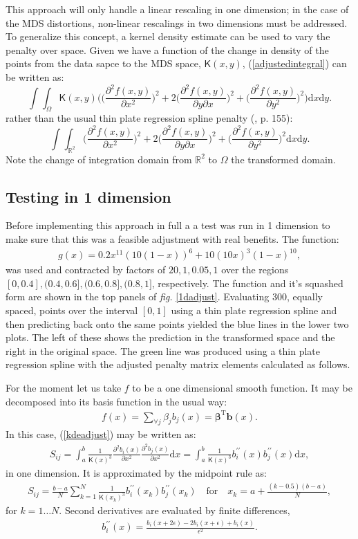 \documentclass[a4paper,10pt]{article}
\newcommand{\fig}[1]{\emph{fig.} \ref{#1}}
\newcommand{\eqn}[1]{(\ref{#1})}
\newcommand{\tr}[1]{#1^{\text{T}}}
\newcommand{\be}{\begin{eqnarray}}
\newcommand{\ee}{\end{eqnarray}}
\newcommand{\tprs}{thin plate regression spline }
\begin{document}
This approach will only handle a linear rescaling in one dimension; in the case of the MDS distortions, non-linear rescalings in two dimensions must be addressed. To generalize this concept, a kernel density estimate can be used to vary the penalty over space. Given we have a function of the change in density of the points from the data sapce to the MDS space, $\mathsf{K}(x,y)$, \eqn{adjustedintegral} can be written as:
\begin{equation}
\int\int_\Omega \mathsf{K}(x,y) \Big( \Big(\frac{\partial^2 f(x,y)}{\partial x^2}\Big)^2 + 2\Big(\frac{\partial^2 f(x,y)}{\partial y \partial x}\Big)^2 + \Big(\frac{\partial^2 f(x,y)}{\partial y^2}\Big)^2\Big) \text{d}x\text{d}y.
\label{kdeadjust}
\end{equation}
rather than the usual thin plate regression spline penalty (\cite{simonbook}, p. 155):
\begin{equation}
\int\int_{\mathbb{R}^2} \Big(\frac{\partial^2 f(x,y)}{\partial x^2}\Big)^2 + 2\Big(\frac{\partial^2 f(x,y)}{\partial y \partial x}\Big)^2 + \Big(\frac{\partial^2 f(x,y)}{\partial y^2}\Big)^2 \text{d}x\text{d}y.
\end{equation}
Note the change of integration domain from $\mathbb{R}^2$ to $\Omega$ the transformed domain.

\subsection{Testing in 1 dimension}

Before implementing this approach in full a a test was run in 1 dimension to make sure that this was a feasible adjustment with real benefits. The function:
\be
g(x)=0.2x^{11}(10(1-x))^6+10(10x)^3(1-x)^{10},
\ee
was used and contracted by factors of $20,1,0.05,1$ over the regions $[0,0.4], (0.4,0.6],(0.6,0.8],(0.8,1]$, respectively. The function and it's squashed form are shown in the top panels of \fig{1dadjust}. Evaluating 300, equally spaced, points over the interval $[0,1]$ using a thin plate regression spline and then predicting back onto the same points yielded the blue lines in the lower two plots. The left of these shows the prediction in the transformed space and the right in the original space. The green line was produced using a \tprs with the adjusted penalty matrix elements calculated as follows.

For the moment let us take $f$ to be a one dimensional smooth function. It may be decomposed into its basis function in the usual way:
\be
f(x)=\sum_{\forall j} \beta_j b_j(x) = \tr{\mathbf{\beta}}\mathbf{b}(x).
\ee
In this case, \eqn{kdeadjust} may be written as:
\be
S_{ij}= \int_a^b \frac{1}{\mathsf{K}(x)^3} \frac{\partial^2 b_i(x)}{\partial x^2}\frac{\partial^2 b_j(x)}{\partial x^2} \text{d}x = \int_a^b \frac{1}{\mathsf{K}(x)^3} b^{\prime\prime}_i(x) b^{\prime\prime}_j(x) \text{d}x,
\ee
in one dimension. It is approximated by the midpoint rule as:
\be
S_{ij}= \frac{b-a}{N}\sum_{k=1}^N \frac{1}{\mathsf{K}(x_k)^3} b^{\prime\prime}_i(x_k) b^{\prime\prime}_j(x_k) \quad \text{for} \quad x_k=a+\frac{(k-0.5)(b-a)}{N},
\ee
for $k=1\dots N$. Second derivatives are evaluated by finite differences,
\be
\label{bfinitediff}
b^{\prime\prime}_i(x) = \frac{ b_i(x+2\epsilon) - 2b_i(x+\epsilon) + b_i(x)}{\epsilon^2}.
\ee
\end{document}
